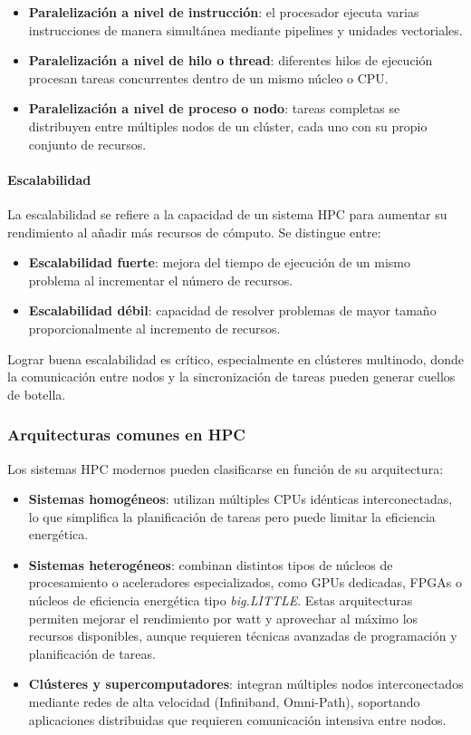 \begin{itemize}
    \item \textbf{Paralelización a nivel de instrucción}: el procesador ejecuta varias instrucciones de manera simultánea mediante pipelines y unidades vectoriales.
    \item \textbf{Paralelización a nivel de hilo o thread}: diferentes hilos de ejecución procesan tareas concurrentes dentro de un mismo núcleo o CPU.
    \item \textbf{Paralelización a nivel de proceso o nodo}: tareas completas se distribuyen entre múltiples nodos de un clúster, cada uno con su propio conjunto de recursos.
\end{itemize}

\paragraph{Escalabilidad}
La escalabilidad se refiere a la capacidad de un sistema HPC para aumentar su rendimiento al añadir más recursos de cómputo. Se distingue entre:

\begin{itemize}
    \item \textbf{Escalabilidad fuerte}: mejora del tiempo de ejecución de un mismo problema al incrementar el número de recursos.
    \item \textbf{Escalabilidad débil}: capacidad de resolver problemas de mayor tamaño proporcionalmente al incremento de recursos.
\end{itemize}

Lograr buena escalabilidad es crítico, especialmente en clústeres multinodo, donde la comunicación entre nodos y la sincronización de tareas pueden generar cuellos de botella.

\subsubsection{Arquitecturas comunes en HPC}

Los sistemas HPC modernos pueden clasificarse en función de su arquitectura:

\begin{itemize}
    \item \textbf{Sistemas homogéneos}: utilizan múltiples CPUs idénticas interconectadas, lo que simplifica la planificación de tareas pero puede limitar la eficiencia energética.
    \item \textbf{Sistemas heterogéneos}: combinan distintos tipos de núcleos de procesamiento o aceleradores especializados, como GPUs dedicadas, FPGAs o núcleos de eficiencia energética tipo \textit{big.LITTLE}. Estas arquitecturas permiten mejorar el rendimiento por watt y aprovechar al máximo los recursos disponibles, aunque requieren técnicas avanzadas de programación y planificación de tareas.
    \item \textbf{Clústeres y supercomputadores}: integran múltiples nodos interconectados mediante redes de alta velocidad (Infiniband, Omni-Path), soportando aplicaciones distribuidas que requieren comunicación intensiva entre nodos.
\end{itemize}

